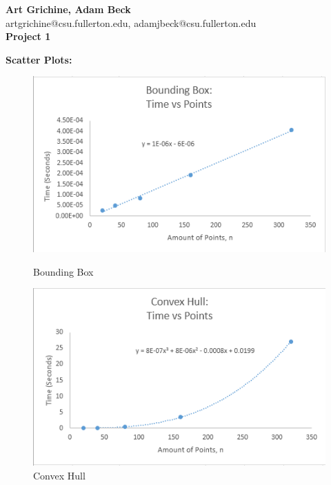 \documentclass[09pt]{article}
\begin{document}
\lstset{language=Python, numbers=left, tabsize=4}
\begin{center}
\Large{\bf Art Grichine, Adam Beck}\\
\Large{artgrichine@csu.fullerton.edu, adamjbeck@csu.fullerton.edu} \\
\Large{\bf Project 1} 
\end{center}


\vspace{0.2in}
\noindent
\textbf{Scatter Plots:}
\begin{figure}[h]
\centering\includegraphics[scale=0.50]{BoundingBoxGraph}
\caption{Bounding Box}
\vspace{0.2in}
\includegraphics[scale=0.50]{ConvexHullGraph}
\caption{Convex Hull}
\end{figure}
\end{document}
